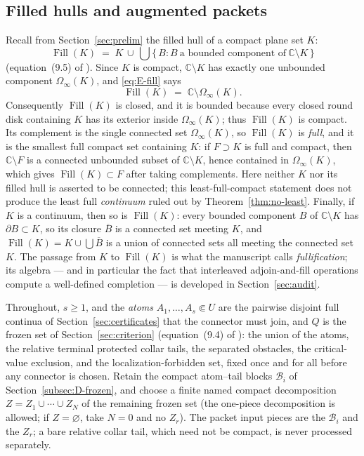 \documentclass[11pt,reqno]{amsart}
\theoremstyle{definition}
\theoremstyle{remark}
\newcommand{\C}{\mathbb C}
\newcommand{\Fill}{\operatorname{Fill}}
\begin{document}
\subsection{Filled hulls and augmented packets}\label{subsec:E-packet-def}

Recall from Section~\ref{sec:prelim} the filled hull of a compact plane set $K$:
\begin{equation}\label{eq:E-fill}
\Fill(K)\;=\;K\,\cup\,\bigcup\bigl\{\,B : B\ \text{a bounded component of}\
\C\setminus K\,\bigr\}
\end{equation}
(equation~(9.5) of \cite{MWman}). Since $K$ is compact, $\C\setminus K$ has exactly
one unbounded component $\Omega_\infty(K)$, and \eqref{eq:E-fill} says
\[
\Fill(K)\;=\;\C\setminus\Omega_\infty(K).
\]
Consequently $\Fill(K)$ is closed, and it is bounded because every closed round disk
containing $K$ has its exterior inside $\Omega_\infty(K)$; thus $\Fill(K)$ is compact.
Its complement is the single connected set $\Omega_\infty(K)$, so $\Fill(K)$ is
\emph{full}, and it is the smallest full compact set containing $K$: if $F\supset K$
is full and compact, then $\C\setminus F$ is a connected unbounded subset of
$\C\setminus K$, hence contained in $\Omega_\infty(K)$, which gives
$\Fill(K)\subset F$ after taking complements.  Here neither $K$ nor its
filled hull is asserted to be connected; this least-full-compact statement
does not produce the least full \emph{continuum} ruled out by
Theorem~\ref{thm:no-least}.  Finally, if $K$ is a continuum, then so
is $\Fill(K)$: every bounded component $B$ of $\C\setminus K$ has
$\partial B\subset K$, so its closure $\overline B$ is a connected set meeting $K$,
and $\Fill(K)=K\cup\bigcup\overline B$ is a union of connected sets all meeting the
connected set $K$. The passage from $K$ to $\Fill(K)$ is what the manuscript calls
\emph{fullification}; its algebra --- and in particular the fact that interleaved
adjoin-and-fill operations compute a well-defined completion --- is developed in
Section~\ref{sec:audit}.

Throughout, $s\ge1$, and the \emph{atoms}
$A_1,\dots,A_s\Subset U$ are the pairwise disjoint full
continua of Section~\ref{sec:certificates} that the connector must join, and $Q$ is
the frozen set of Section~\ref{sec:criterion} (equation~(9.4) of \cite{MWman}): the
union of the atoms, the relative terminal protected collar tails, the separated obstacles,
the critical-value exclusion, and the localization-forbidden set, fixed once and for
all before any connector is chosen.  Retain the compact atom--tail blocks
$\mathcal B_i$ of Section~\ref{subsec:D-frozen}, and choose a finite named compact
decomposition $Z=Z_1\cup\cdots\cup Z_N$ of the remaining frozen set
(the one-piece decomposition is allowed; if $Z=\varnothing$, take $N=0$
and no $Z_r$).  The packet input pieces are
the $\mathcal B_i$ and the $Z_r$; a bare relative collar tail, which need not be
compact, is never processed separately.
\end{document}
